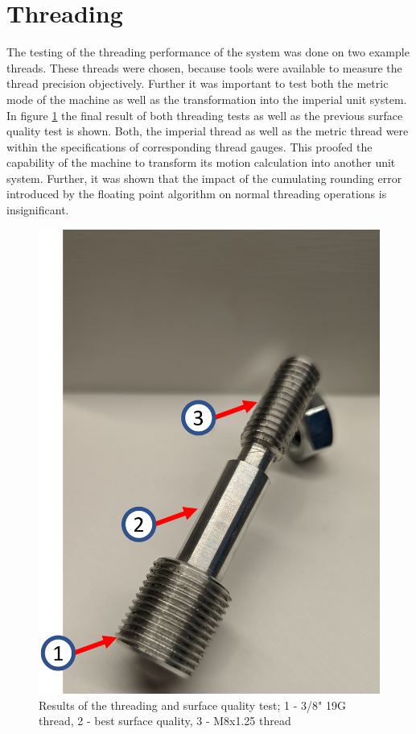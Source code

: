 \section{Threading}
The testing of the threading performance of the system was done on two example threads. These threads were chosen, because tools were available to measure the thread precision objectively. Further it was important to test both the metric mode of the machine as well as the transformation into the imperial unit system. In figure \ref{ResThread} the final result of both threading tests as well as the previous surface quality test is shown. Both, the imperial thread as well as the metric thread were within the specifications of corresponding thread gauges. This proofed the capability of the machine to transform its motion calculation into another unit system. Further, it was shown that the impact of the cumulating rounding error introduced by the floating point algorithm on normal threading operations is insignificant. 

\begin{figure}
    \begin{center}
    \includegraphics[width=12cm]{Pictures/ResThreadSurf.png}
    \caption[Results of the threading and surface quality test]{Results of the threading and surface quality test; 1 - 3/8" 19G thread, 2 - best surface quality, 3 - M8x1.25 thread}
    \label{ResThread}
    \end{center}
\end{figure}

